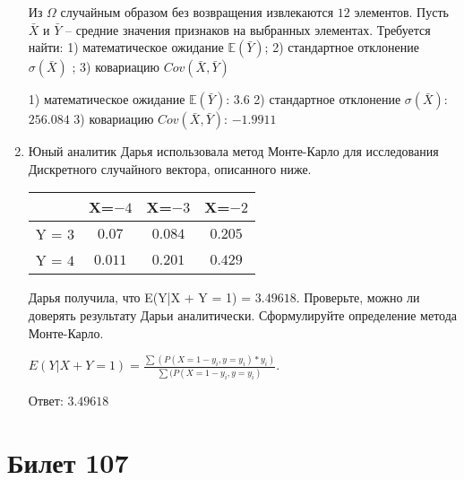 \documentclass[a4paper,12pt]{article}
\begin{document}
\begin{enumerate}
Из $\Omega$ случайным образом без возвращения извлекаются $12$ элементов. 
Пусть $\bar X$ и $\bar Y$ – средние значения признаков на выбранных элементах. 
Требуется найти: 1) математическое ожидание $\mathbb{E}(\bar Y)$; 2) стандартное отклонение $\sigma(\bar X)$ ; 
3) ковариацию $Cov(\bar X, \bar Y)$




1) математическое ожидание $\mathbb{E}(\bar Y)$: $3.6$ 
2) стандартное отклонение $\sigma(\bar X)$: $256.084$
3) ковариацию $Cov(\bar X, \bar Y)$: $-1.9911$


\item

    
    	Юный аналитик Дарья использовала метод Монте-Карло для исследования Дискретного случайного вектора, описанного ниже.

        \begin{tabular}{|c|c|c|c|}
	\hline
	& X=$-4$ & X=$-3$ & X=$-2$ \\
	\hline
	Y = $3$ & $0.07$ & $0.084$  &  $0.205$ \\
	\hline
	Y = $4$ & $0.011$ & $0.201$ & $0.429$  \\
	\hline
\end{tabular}

    	Дарья получила, что E(Y|X + Y = 1) = $3.49618$.
    	Проверьте, можно ли доверять результату Дарьи аналитически. Сформулируйте определение метода Монте-Карло.
    


    
        $E(Y|X+Y=1) = \frac{\sum(P(X=1 - y_i, y=y_i) * y_i)}{\sum(P(X=1 - y_i, y=y_i)}$.

        Ответ: $3.49618$
    


\end{enumerate}

\section{Билет 107}
\end{document}
